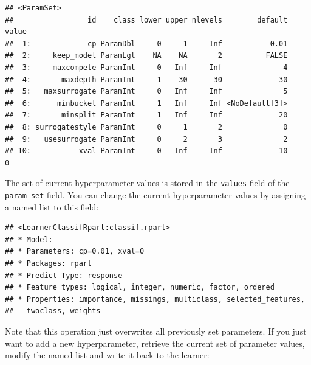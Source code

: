 \documentclass[
]{scrbook}
\newenvironment{Shaded}{\begin{snugshade}}{\end{snugshade}}
\newcommand{\AttributeTok}[1]{\textcolor[rgb]{0.77,0.63,0.00}{#1}}
\newcommand{\DecValTok}[1]{\textcolor[rgb]{0.00,0.00,0.81}{#1}}
\newcommand{\FloatTok}[1]{\textcolor[rgb]{0.00,0.00,0.81}{#1}}
\newcommand{\FunctionTok}[1]{\textcolor[rgb]{0.00,0.00,0.00}{#1}}
\newcommand{\NormalTok}[1]{#1}
\newcommand{\OtherTok}[1]{\textcolor[rgb]{0.56,0.35,0.01}{#1}}
\newcommand{\SpecialCharTok}[1]{\textcolor[rgb]{0.00,0.00,0.00}{#1}}
\renewenvironment{Shaded} {\begin{snugshade}\small} {\end{snugshade}}
\begin{document}
\begin{verbatim}
## <ParamSet>
##                 id    class lower upper nlevels        default value
##  1:             cp ParamDbl     0     1     Inf           0.01      
##  2:     keep_model ParamLgl    NA    NA       2          FALSE      
##  3:     maxcompete ParamInt     0   Inf     Inf              4      
##  4:       maxdepth ParamInt     1    30      30             30      
##  5:   maxsurrogate ParamInt     0   Inf     Inf              5      
##  6:      minbucket ParamInt     1   Inf     Inf <NoDefault[3]>      
##  7:       minsplit ParamInt     1   Inf     Inf             20      
##  8: surrogatestyle ParamInt     0     1       2              0      
##  9:   usesurrogate ParamInt     0     2       3              2      
## 10:           xval ParamInt     0   Inf     Inf             10     0
\end{verbatim}

The set of current hyperparameter values is stored in the \texttt{values} field of the \texttt{param\_set} field.
You can change the current hyperparameter values by assigning a named list to this field:

\begin{Shaded}
\end{Shaded}

\begin{verbatim}
## <LearnerClassifRpart:classif.rpart>
## * Model: -
## * Parameters: cp=0.01, xval=0
## * Packages: rpart
## * Predict Type: response
## * Feature types: logical, integer, numeric, factor, ordered
## * Properties: importance, missings, multiclass, selected_features,
##   twoclass, weights
\end{verbatim}

Note that this operation just overwrites all previously set parameters.
If you just want to add a new hyperparameter, retrieve the current set of parameter values, modify the named list and write it back to the learner:

\begin{Shaded}
\end{Shaded}
\end{document}
